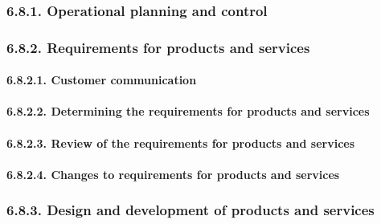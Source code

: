 \documentclass[
]{article}
\begin{document}
\hypertarget{operational-planning-and-control-1}{%
\subsubsection{6.8.1. Operational planning and
control}\label{operational-planning-and-control-1}}

\hypertarget{requirements-for-products-and-services-1}{%
\subsubsection{6.8.2. Requirements for products and
services}\label{requirements-for-products-and-services-1}}

\hypertarget{customer-communication-1}{%
\paragraph{6.8.2.1. Customer
communication}\label{customer-communication-1}}

\hypertarget{determining-the-requirements-for-products-and-services-1}{%
\paragraph{6.8.2.2. Determining the requirements for products and
services}\label{determining-the-requirements-for-products-and-services-1}}

\hypertarget{review-of-the-requirements-for-products-and-services-1}{%
\paragraph{6.8.2.3. Review of the requirements for products and
services}\label{review-of-the-requirements-for-products-and-services-1}}

\hypertarget{changes-to-requirements-for-products-and-services-1}{%
\paragraph{6.8.2.4. Changes to requirements for products and
services}\label{changes-to-requirements-for-products-and-services-1}}

\hypertarget{design-and-development-of-products-and-services-1}{%
\subsubsection{6.8.3. Design and development of products and
services}\label{design-and-development-of-products-and-services-1}}
\end{document}
